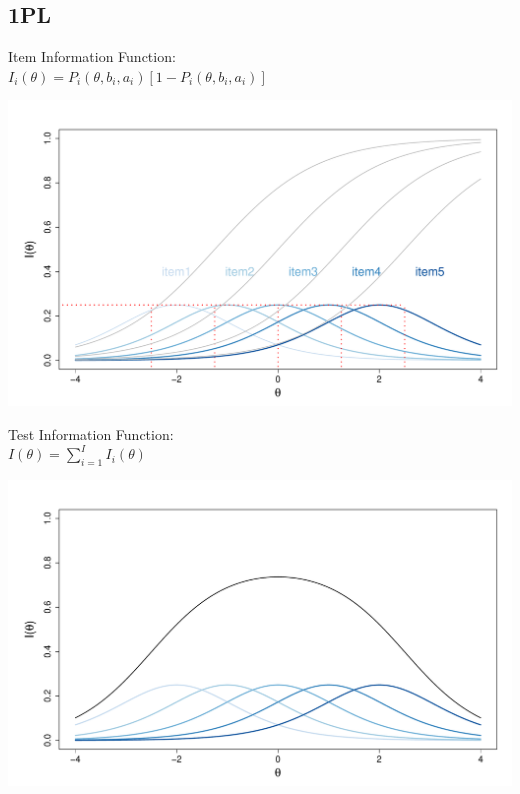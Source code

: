 \documentclass[aspectratio=149, compress]{beamer}
\begin{document}
\subsection*{1PL}

\begin{frame}
	
	\centering
	\begin{overprint}
		
		\centering
	
		\vspace*{3mm}
		
		Item Information Function:	\\
		$I_i(\theta) = P_i(\theta, b_i, a_i)[1-P_i(\theta, b_i, a_i)]$
		
		\centering
		\includegraphics[width=.80\linewidth]{img/iif-1pl.pdf}
		
		\vspace*{3mm}
		Test Information Function:	\\	$I(\theta) =  \sum_{i = 1}^{I} I_i(\theta)$
		
		\centering
		\includegraphics[width=.80\linewidth]{img/tif-1pl.pdf}
	\end{overprint}
\end{frame}
\end{document}
